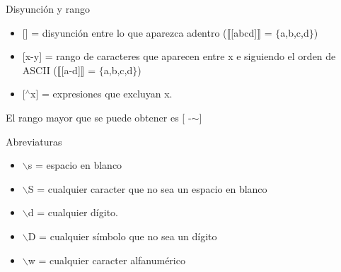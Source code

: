 \documentclass{beamer}
\begin{document}
\begin{frame}{Disyunción y rango}
\begin{itemize}
\item {} [] = disyunción entre lo que aparezca adentro ($\llbracket$[abcd]$\rrbracket$ = $\lbrace$a,b,c,d$\rbrace$)

\item {} [x-y] = rango de caracteres que aparecen entre x e siguiendo el orden de ASCII ($\llbracket$[a-d]$\rrbracket$ = $\lbrace$a,b,c,d$\rbrace$)

\item {} [$^{\wedge}$x] = expresiones que excluyan x.
\end{itemize}

El rango mayor que se puede obtener es [ -$\sim$]



\end{frame}

\begin{frame}{Abreviaturas}
\begin{itemize}
\item $\backslash$s = espacio en blanco
\item $\backslash$S = cualquier caracter que no sea un espacio en blanco
\item $\backslash$d = cualquier dígito.
\item $\backslash$D = cualquier símbolo que no sea un dígito
\item $\backslash$w = cualquier caracter alfanumérico
\end{itemize}


\end{frame}

\end{document}
